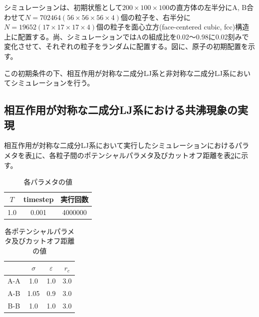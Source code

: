 \documentclass[titlepage]{jsreport}
\begin{document}
シミュレーションは、初期状態として$200×100×100$の直方体の左半分にA, B合わせて$N=702464(56×56×56×4)$個の粒子を、右半分に$N=19652(17×17×17×4)$個の粒子を面心立方(face-centered cubic, fcc)構造上に配置する。尚、シミュレーションではAの組成比を0.02〜0.98に0.02刻みで変化させて、それぞれの粒子をランダムに配置する。図に、原子の初期配置を示す。

この初期条件の下、相互作用が対称な二成分LJ系と非対称な二成分LJ系においてシミュレーションを行う。

\subsection{相互作用が対称な二成分LJ系における共沸現象の実現} \label{method-subsec:bi-symmetric-component-azeotrope}
相互作用が対称な二成分LJ系において実行したシミュレーションにおけるパラメタを表\ref{table:symmetric-bi-component-azeotrope-parameter}に、各粒子間のポテンシャルパラメタ及びカットオフ距離を表\ref{table:symmetric-bi-component-azeotrope-potential-parameter}に示す。

\begin{table}[htbp]
    \begin{center}
        \caption{各パラメタの値}
        \label{table:symmetric-bi-component-azeotrope-parameter}
            \begin{tabular}{c c c}
                $T$ & timestep & 実行回数 \\
                \hline
                1.0 & 0.001 & 4000000 \\
            \end{tabular}
    \end{center}
\end{table}

\begin{table}[htbp]
    \begin{center}
        \caption{各ポテンシャルパラメタ及びカットオフ距離の値}
        \label{table:symmetric-bi-component-azeotrope-potential-parameter}
            \begin{tabular}{c c c c}
                & $\sigma$ & $\varepsilon$ & $r_c$ \\
                \hline
                A-A & 1.0 & 1.0 & 3.0 \\
                A-B & 1.05 & 0.9 & 3.0 \\
                B-B & 1.0 & 1.0 & 3.0
            \end{tabular}
    \end{center}
\end{table}
\end{document}
